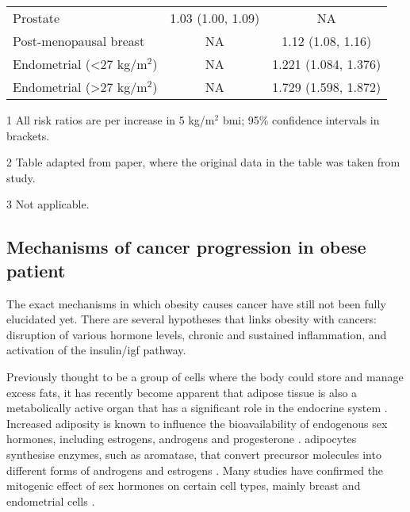\begin{table}[h]
\begin{threeparttable}
\begin{tabular}{lcc}
			Prostate                                & 1.03 (1.00, 1.09) & NA\\
			Post-menopausal breast                  & NA                & 1.12 (1.08, 1.16)\\
			Endometrial (\textless{}27 kg/m$^2$)    & NA                & 1.221 (1.084, 1.376)\\
			Endometrial (\textgreater{}27 kg/m$^2$) & NA                & 1.729 (1.598, 1.872)\\
			\hline
			\hline
		\end{tabular}
		\begin{tablenotes}
			\begin{footnotesize}
				\item [1] All risk ratios are per increase in 5 kg/m$^2$ \gls{bmi}; 95\% confidence intervals in brackets.
				\item [2] Table adapted from \citet{Roberts2010} paper, where the original data in the table was taken from \citet{Renehan2008} study.
				\item [3] Not applicable.
			\end{footnotesize}
		\end{tablenotes}
	\end{threeparttable}
\end{table}

\subsection{Mechanisms of cancer progression in obese patient}
\label{sub:mechanisms_of_cancer_progression_in_obese_patient}

The exact mechanisms in which obesity causes cancer have still not been fully elucidated yet.
There are several hypotheses that links obesity with cancers: disruption of various hormone levels, chronic and sustained inflammation, and activation of the insulin/\gls{igf} pathway.

Previously thought to be a group of cells where the body could store and manage excess fats, it has recently become apparent that adipose tissue is also a metabolically active organ that has a significant role in the endocrine system \citep{Roberts2010}.
Increased adiposity is known to influence the bioavailability of endogenous sex hormones, including estrogens, androgens and progesterone \citep{Calle2004}.
\Glspl{adipocyte} synthesise enzymes, such as aromatase, that convert precursor molecules into different forms of androgens and estrogens \citep{Calle2004}.
Many studies have confirmed the mitogenic effect of sex hormones on certain cell types, mainly breast and endometrial cells \citep{Roberts2010}.

